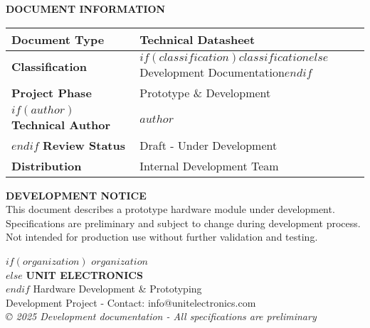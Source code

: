 \documentclass[11pt,a4paper]{article}
\begin{document}
\begin{titlepage}
    \vspace{1cm}
    
    \begin{tcolorbox}[
        colback=white,
        colframe=black,
        width=0.9\textwidth,
        arc=0mm,
        boxrule=1pt,
        halign=center
    ]
    {\normalsize \textbf{DOCUMENT INFORMATION}}\\[0.3cm]
    \begin{tabular}{|l|l|}
    \hline
    \textbf{Document Type} & Technical Datasheet \\
    \hline
    \textbf{Classification} & $if(classification)$$classification$$else$Development Documentation$endif$ \\
    \hline
    \textbf{Project Phase} & Prototype \& Development \\
    \hline
    $if(author)$
    \textbf{Technical Author} & $author$ \\
    \hline
    $endif$
    \textbf{Review Status} & Draft - Under Development \\
    \hline
    \textbf{Distribution} & Internal Development Team \\
    \hline
    \end{tabular}
    \end{tcolorbox}
    
    \vspace{0.8cm}
    
    \begin{tcolorbox}[
        colback=yellow!5!white,
        colframe=orange!75!black,
        width=\textwidth,
        arc=1mm,
        boxrule=1pt
    ]
    \centering
    {\small \textbf{DEVELOPMENT NOTICE}}\\[0.2cm]
    {\footnotesize This document describes a prototype hardware module under development.}\\
    {\footnotesize Specifications are preliminary and subject to change during development process.}\\
    {\footnotesize Not intended for production use without further validation and testing.}
    \end{tcolorbox}
    
    \vfill
    
    \begin{tcolorbox}[
        colback=blue!10!white,
        colframe=blue!50!black,
        width=\textwidth,
        arc=0mm,
        boxrule=1pt
    ]
    \centering
    $if(organization)$
    {\large \textbf{$organization$}}\\[0.1cm]
    $else$
    {\large \textbf{UNIT ELECTRONICS}}\\[0.1cm]
    $endif$
    {\small Hardware Development \& Prototyping}\\
    {\footnotesize Development Project - Contact: info@unitelectronics.com}\\
    {\tiny \textit{© 2025 Development documentation - All specifications are preliminary}}
    \end{tcolorbox}
    

\end{titlepage}
\end{document}
